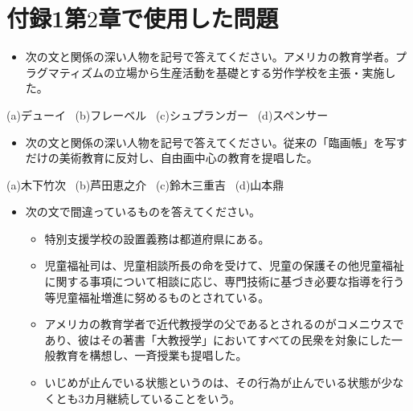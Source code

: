 \documentclass[12pt]{jarticle}
\numberwithin{equation}{subsection}
\begin{document}
\section*{付録1\hspace{3pt}第$2$章で使用した問題}
\begin{itemize}
  \item[($1$)]次の文と関係の深い人物を記号で答えてください。アメリカの教育学者。プラグマティズムの立場から生産活動を基礎とする労作学校を主張・実施した。
\end{itemize}
\begin{center}
  (a)デューイ \ (b)フレーベル \ (c)シュプランガー \ (d)スペンサー
\end{center}
\begin{itemize}
  \item[($2$)]次の文と関係の深い人物を記号で答えてください。従来の「臨画帳」を写すだけの美術教育に反対し、自由画中心の教育を提唱した。
\end{itemize}
\begin{center}
  (a)木下竹次 \ (b)芦田恵之介 \ (c)鈴木三重吉 \ (d)山本鼎
\end{center}
\begin{itemize}
  \item[($3$)]次の文で間違っているものを答えてください。
    \begin{itemize}
    \item[(a)]特別支援学校の設置義務は都道府県にある。
    \item[(b)]児童福祉司は、児童相談所長の命を受けて、児童の保護その他児童福祉に関する事項について相談に応じ、専門技術に基づき必要な指導を行う等児童福祉増進に努めるものとされている。
    \item[(c)]アメリカの教育学者で近代教授学の父であるとされるのがコメニウスであり、彼はその著書「大教授学」においてすべての民衆を対象にした一般教育を構想し、一斉授業も提唱した。
    \item[(d)]いじめが止んでいる状態というのは、その行為が止んでいる状態が少なくとも$3$カ月継続していることをいう。
    \end{itemize}
\end{itemize}
\end{document}
